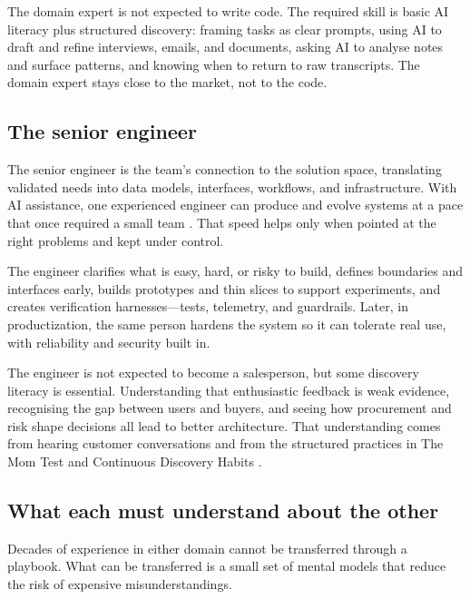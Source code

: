 \documentclass[10pt, a4paper, twocolumn]{article} %
\begin{document}
The domain expert is not expected to write code. The required skill is basic AI literacy plus structured discovery: framing tasks as clear prompts, using AI to draft and refine interviews, emails, and documents, asking AI to analyse notes and surface patterns, and knowing when to return to raw transcripts. The domain expert stays close to the market, not to the code.

\subsection{The senior engineer}

The senior engineer is the team's connection to the solution space, translating validated needs into data models, interfaces, workflows, and infrastructure. With AI assistance, one experienced engineer can produce and evolve systems at a pace that once required a small team \citep{forsgren2018accelerate,blomgren2025coordination}. That speed helps only when pointed at the right problems and kept under control.

The engineer clarifies what is easy, hard, or risky to build, defines boundaries and interfaces early, builds prototypes and thin slices to support experiments, and creates verification harnesses—tests, telemetry, and guardrails. Later, in productization, the same person hardens the system so it can tolerate real use, with reliability and security built in.

The engineer is not expected to become a salesperson, but some discovery literacy is essential. Understanding that enthusiastic feedback is weak evidence, recognising the gap between users and buyers, and seeing how procurement and risk shape decisions all lead to better architecture. That understanding comes from hearing customer conversations and from the structured practices in The Mom Test and Continuous Discovery Habits \citep{fitzpatrick2013mom,torres2021continuous}.

\newpage

\subsection{What each must understand about the other}

Decades of experience in either domain cannot be transferred through a playbook. What can be transferred is a small set of mental models that reduce the risk of expensive misunderstandings.
\end{document}
